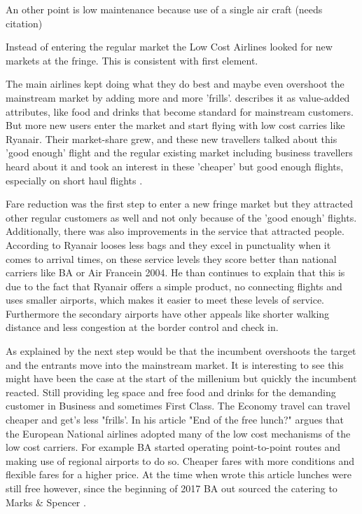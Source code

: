 \documentclass[a4paper, 11pt]{article}
\begin{document}
An other point is low maintenance because use of a single air craft (needs citation)

Instead of entering the regular market the Low Cost Airlines looked for new markets at the fringe. This is consistent with
\cite{Christensen2015} first element.


The main airlines kept doing what they do best and maybe even overshoot the mainstream market by adding more and more 'frills'. \cite{Droege} describes it as value-added attributes, like food and drinks that become standard for mainstream customers. But more new users enter the market and start flying with low cost carries like Ryanair. Their market-share grew, and these new travellers talked about this 'good enough' flight and the regular existing market including business travellers heard about it and took an interest in these 'cheaper' but good enough flights, especially on short haul flights \citep{TiddBessant}.

Fare reduction was the first step to enter a new fringe market but they attracted other regular customers as well and not only because of the 'good enough' flights. Additionally, there was also improvements in the service that attracted people. According to \cite{Barrett} Ryanair looses less bags and they excel in punctuality when it comes to arrival times, on these service levels they score better than national carriers like BA or Air Francein 2004. He \citep{Barrett} than continues to explain that this is due to the fact that Ryanair offers a simple product, no connecting flights and uses smaller airports, which makes it easier to meet these levels of service. Furthermore the secondary airports have other appeals like shorter walking distance and less congestion at the border control and check in.

As explained by \cite{Christensen2015} the next step would be that the incumbent overshoots the target and the entrants move into
the mainstream market. It is interesting to see this might have been the case at the start of the millenium but quickly the
incumbent reacted. Still providing leg space and free food and drinks for the demanding customer in Business and sometimes
First Class. The Economy travel can travel cheaper and get's less "frills'. In his article "End of the free lunch?"
\cite{Dennis} argues that the European National airlines adopted many of the low cost mechanisms of the low cost carriers. For
example BA started operating point-to-point routes and making use of regional airports to do so. Cheaper fares with more
conditions and flexible fares for a higher price. At the time when \cite{Dennis} wrote this article lunches were still free
however, since the beginning of 2017 BA out sourced the catering to Marks \& Spencer \citep{Calder}.
\end{document}
